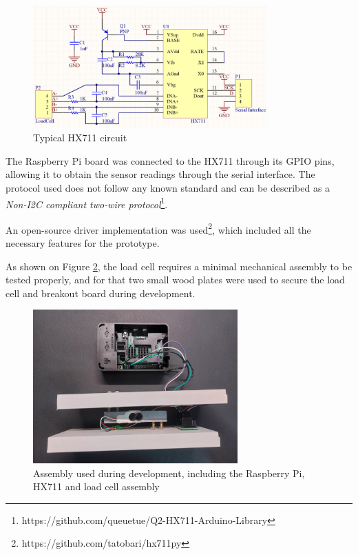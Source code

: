 \documentclass[openright]{normas-utf-tex} %
\begin{document}
\begin{figure}[H]
	\centering
	\includegraphics[width=0.8\textwidth]{./images/hx711circuit.png}
	\caption[Typical HX711 circuit]{Typical HX711 circuit}
    \label{fig:hx711circuit}
\end{figure}

The Raspberry Pi board was connected to the HX711 through its GPIO pins,
allowing it to obtain the sensor readings through the serial interface. The
protocol used does not follow any known standard and can be
described as a \textit{Non-I2C compliant two-wire
protocol}\footnote{https://github.com/queuetue/Q2-HX711-Arduino-Library}.

An open-source driver implementation was used\footnote{https://github.com/tatobari/hx711py}, 
which included all the necessary features for the prototype.

As shown on Figure \ref{fig:devassembly}, the load cell requires a minimal
mechanical assembly to be tested properly, and for that two small wood plates
were used to secure the load cell and breakout board during development.

\begin{figure}[H]
	\centering
	\includegraphics[width=0.7\textwidth]{./images/raspberrypiwithloadcell.jpeg}
    \caption[Assembly used during development, including the Raspberry Pi, HX711 and load cell assembly]{Assembly used during development, including the Raspberry Pi, HX711 and load cell assembly}
	\label{fig:devassembly}
\end{figure}
\end{document}
